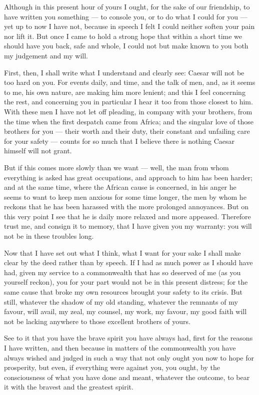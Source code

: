 

 Although in this present hour of yours I ought, for the sake of our friendship, to have written you something --- to console you, or to do what I could for you --- yet up to now I have not, because in speech I felt I could neither soften your pain nor lift it. But once I came to hold a strong hope that within a short time we should have you back, safe and whole, I could not but make known to you both my judgement and my will.

 First, then, I shall write what I understand and clearly see: Caesar will not be too hard on you. For events daily, and time, and the talk of men, and, as it seems to me, his own nature, are making him more lenient; and this I feel concerning the rest, and concerning you in particular I hear it too from those closest to him. With these men I have not let off pleading, in company with your brothers, from the time when the first despatch came from Africa; and the singular love of those brothers for you --- their worth and their duty, their constant and unfailing care for your safety --- counts for so much that I believe there is nothing Caesar himself will not grant.

 But if this comes more slowly than we want --- well, the man from whom everything is asked has great occupations, and approach to him has been harder; and at the same time, where the African cause is concerned, in his anger he seems to want to keep men anxious for some time longer, the men by whom he reckons that he has been harassed with the more prolonged annoyances. But on this very point I see that he is daily more relaxed and more appeased. Therefore trust me, and consign it to memory, that I have given you my warranty: you will not be in these troubles long.

 Now that I have set out what I think, what I want for your sake I shall make clear by the deed rather than by speech. If I had as much power as I should have had, given my service to a commonwealth that has so deserved of me (as you yourself reckon), you for your part would not be in this present distress; for the same cause that broke my own resources brought your safety to its crisis. But still, whatever the shadow of my old standing, whatever the remnants of my favour, will avail, my zeal, my counsel, my work, my favour, my good faith will not be lacking anywhere to those excellent brothers of yours.

 See to it that you have the brave spirit you have always had, first for the reasons I have written, and then because in matters of the commonwealth you have always wished and judged in such a way that not only ought you now to hope for prosperity, but even, if everything were against you, you ought, by the consciousness of what you have done and meant, whatever the outcome, to bear it with the bravest and the greatest spirit.
